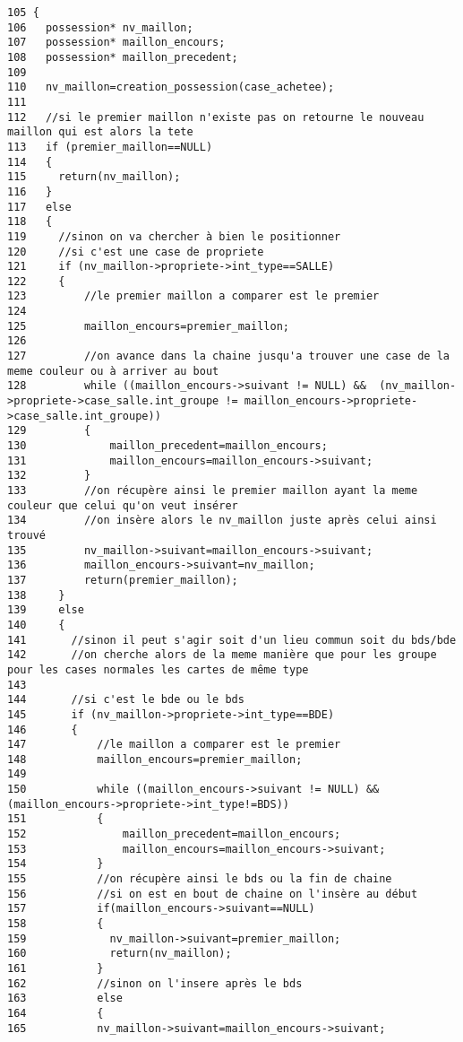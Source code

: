 \begin{Code}\begin{verbatim}105 {
106   possession* nv_maillon;
107   possession* maillon_encours;
108   possession* maillon_precedent;
109   
110   nv_maillon=creation_possession(case_achetee);
111   
112   //si le premier maillon n'existe pas on retourne le nouveau maillon qui est alors la tete
113   if (premier_maillon==NULL)
114   {
115     return(nv_maillon);
116   }
117   else
118   {
119     //sinon on va chercher à bien le positionner
120     //si c'est une case de propriete
121     if (nv_maillon->propriete->int_type==SALLE)
122     {
123         //le premier maillon a comparer est le premier
124                       
125         maillon_encours=premier_maillon;
126 
127         //on avance dans la chaine jusqu'a trouver une case de la meme couleur ou à arriver au bout
128         while ((maillon_encours->suivant != NULL) &&  (nv_maillon->propriete->case_salle.int_groupe != maillon_encours->propriete->case_salle.int_groupe))
129         {
130             maillon_precedent=maillon_encours;
131             maillon_encours=maillon_encours->suivant;
132         }
133         //on récupère ainsi le premier maillon ayant la meme couleur que celui qu'on veut insérer
134         //on insère alors le nv_maillon juste après celui ainsi trouvé
135         nv_maillon->suivant=maillon_encours->suivant;
136         maillon_encours->suivant=nv_maillon;
137         return(premier_maillon);
138     }
139     else
140     {
141       //sinon il peut s'agir soit d'un lieu commun soit du bds/bde
142       //on cherche alors de la meme manière que pour les groupe pour les cases normales les cartes de même type
143       
144       //si c'est le bde ou le bds
145       if (nv_maillon->propriete->int_type==BDE)
146       {     
147           //le maillon a comparer est le premier
148           maillon_encours=premier_maillon;
149         
150           while ((maillon_encours->suivant != NULL) &&  (maillon_encours->propriete->int_type!=BDS))
151           {
152               maillon_precedent=maillon_encours;
153               maillon_encours=maillon_encours->suivant;
154           }
155           //on récupère ainsi le bds ou la fin de chaine
156           //si on est en bout de chaine on l'insère au début
157           if(maillon_encours->suivant==NULL)
158           {
159             nv_maillon->suivant=premier_maillon;
160             return(nv_maillon);
161           }
162           //sinon on l'insere après le bds
163           else
164           {
165           nv_maillon->suivant=maillon_encours->suivant;

\end{verbatim}
\end{Code}
